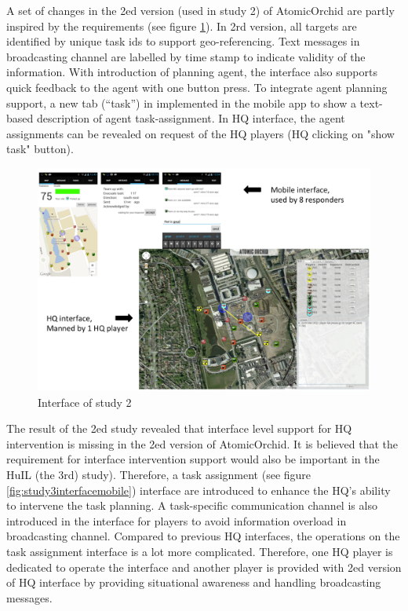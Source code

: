 A set of changes in the 2ed version (used in study 2) of AtomicOrchid are partly inspired by the requirements (see figure \ref{fig:study2interface}). In 2rd version, all targets are identified by unique task ids to support geo-referencing. Text messages in broadcasting channel are labelled by time stamp to indicate validity of the information. With introduction of planning agent, the interface also supports quick feedback to the agent with one button press. To integrate agent planning support, a new tab (``task'') in implemented in the mobile app to show a text-based description of agent task-assignment. In HQ interface, the agent assignments can be revealed on request of the HQ players (HQ clicking on "show task" button).\\

\begin{figure}[H]
  \centering
  \includegraphics[width=1\textwidth]{img/conclusion/study2interface}
  \caption{Interface of study 2}
  \label{fig:study2interface}
\end{figure}

The result of the 2ed study revealed that interface level support for HQ intervention is missing in the 2ed version of AtomicOrchid. It is believed that the requirement for interface intervention support would also be important in the HuIL (the 3rd) study). Therefore, a task assignment (see figure \ref{fig:study3interfacemobile}) interface are introduced to enhance the HQ's ability to intervene the task planning. A task-specific communication channel is also introduced in the interface for players to avoid information overload in broadcasting channel. Compared to previous HQ interfaces, the operations on the task assignment interface is a lot more complicated. Therefore, one HQ player is dedicated to operate the interface and another player is provided with 2ed version of HQ interface by providing situational awareness and handling broadcasting messages. 

